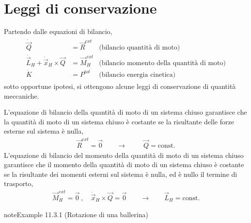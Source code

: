 \documentclass[letterpaper,10pt,italian]{jupyterBook}
\begin{document}
\section{Leggi di conservazione}
\label{\detokenize{ch/mechanics/dynamics-conservation:leggi-di-conservazione}}\label{\detokenize{ch/mechanics/dynamics-conservation:physics-hs-mechanics-dynamics-conservation}}\label{\detokenize{ch/mechanics/dynamics-conservation::doc}}
\sphinxAtStartPar
Partendo dalle equazioni di bilancio,
\begin{equation*}
\begin{split}\begin{aligned}
 \dot{\vec{Q}} & = \vec{R}^{ext} & \text{(bilancio quantità di moto)} \\
 \dot{\vec{L}}_H + \dot{\vec{x}}_H \times \vec{Q} & = \vec{M}_H^{ext} & \text{(bilancio momento della quantità di moto)} \\
 \dot{K} & = P^{tot} & \text{(bilancio energia cinetica)}
\end{aligned}\end{split}
\end{equation*}
\sphinxAtStartPar
sotto opportune ipotesi, si ottengono alcune leggi di conservazione di quantità meccaniche.

\sphinxAtStartPar
{}
L’equazione di bilancio della quantità di moto di un sistema chiuso garantisce che la quantità di moto di un sistema chiuso è costante se la risultante delle forze esterne sul sistema è nulla,
\begin{equation*}
\begin{split}
  \vec{R}^{ext} = \vec{0} \qquad  \rightarrow \qquad \ \ \vec{Q} = \text{const.} 
\end{split}
\end{equation*}
\sphinxAtStartPar
{}
L’equazione di bilancio del momento della quantità di moto di un sistema chiuso garantisce che il momento della quantità di moto di un sistema chiuso è costante se la risultante dei momenti esterni sul sistema è nulla, ed è nullo il termine di trasporto,
\begin{equation*}
\begin{split}
  \vec{M}_H^{ext} = \vec{0} \ , \quad \dot{\vec{x}}_H \times \vec{Q} = \vec{0} \qquad  \rightarrow \qquad \vec{L}_H = \text{const.}
\end{split}
\end{equation*}\label{ch/mechanics/dynamics-conservation:mechanics:dynamics:dancer}
\begin{sphinxadmonition}{note}{Example 11.3.1 (Rotazione di una ballerina)}


\end{sphinxadmonition}
\end{document}
